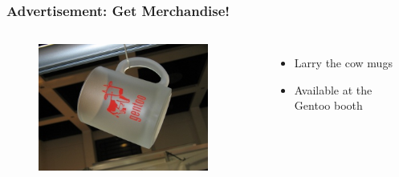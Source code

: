 \documentclass[svgnames]{beamer}
\begin{document}
\begin{frame}
  \frametitle{Advertisement: Get Merchandise!}
  
  \begin{columns}[c]
    
    \begin{figure}
      \includegraphics[width=0.9\textwidth]{img/gentoo_mug.jpg} 
    \end{figure}
    
    
    \begin{itemize}
     \item Larry the cow mugs
     \item Available at the Gentoo booth
    \end{itemize}

  \end{columns}

\end{frame}

  
\end{document}
